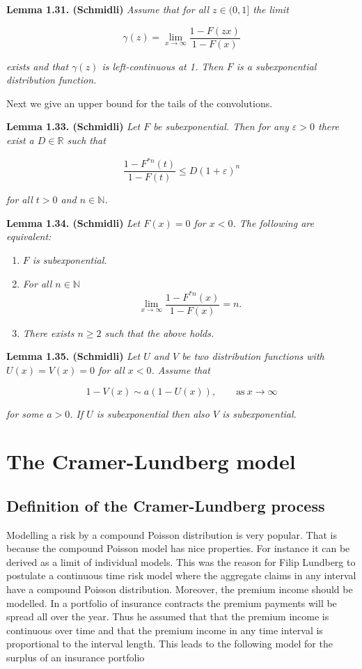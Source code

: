 \documentclass[a4paper,12pt,openany]{book}
\providecommand{\tightlist}{%
 \setlength{\itemsep}{0pt}\setlength{\parskip}{0pt}}
\begin{document}
\textbf{Lemma 1.31. (Schmidli)} \emph{Assume that for all \(z\in (0,1]\) the limit}

\[
\gamma(z)=\lim_{x\to\infty}\frac{1-F(zx)}{1-F(x)}
\]

\emph{exists and that \(\gamma(z)\) is left-continuous at 1. Then \(F\) is a subexponential distribution function.}

Next we give an upper bound for the tails of the convolutions.

\textbf{Lemma 1.33. (Schmidli)} \emph{Let \(F\) be subexponential. Then for any \(\varepsilon>0\) there exist a \(D\in\mathbb R\) such that}

\[
\frac{1-F^{*n}(t)}{1-F(t)}\le D(1+\varepsilon)^n
\]

\emph{for all \(t>0\) and \(n\in\mathbb N\).}

\textbf{Lemma 1.34. (Schmidli)} \emph{Let \(F(x)=0\) for \(x<0\). The following are equivalent:}

\begin{enumerate}
\def\labelenumi{\roman{enumi})}
\tightlist
\item
  \emph{\(F\) is subexponential.}
\item
  \emph{For all \(n\in\mathbb N\)}
  \[\lim_{x\to\infty}\frac{1-F^{*n}(x)}{1-F(x)}=n.\]
\item
  \emph{There exists \(n\ge 2\) such that the above holds.}
\end{enumerate}

\textbf{Lemma 1.35. (Schmidli)} \emph{Let \(U\) and \(V\) be two distribution functions with \(U(x)=V(x)=0\) for all \(x<0\). Assume that}

\[
1-V(x)\sim a(1-U(x)),\qquad \text{as}\ x\to\infty
\]

\emph{for some \(a>0\). If \(U\) is subexponential then also \(V\) is subexponential.}

\hypertarget{the-cramer-lundberg-model}{%
\section{The Cramer-Lundberg model}\label{the-cramer-lundberg-model}}

\hypertarget{definition-of-the-cramer-lundberg-process}{%
\subsection{Definition of the Cramer-Lundberg process}\label{definition-of-the-cramer-lundberg-process}}

Modelling a risk by a compound Poisson distribution is very popular. That is because the compound Poisson model has nice properties. For instance it can be derived as a limit of individual models. This was the reason for Filip Lundberg to postulate a continuous time risk model where the aggregate claims in any interval have a compound Poisson distribution. Moreover, the premium income should be modelled. In a portfolio of insurance contracts the premium payments will be spread all over the year. Thus he assumed that that the premium income is continuous over time and that the premium income in any time interval is proportional to the interval length. This leads to the following model for the surplus of an insurance portfolio
\end{document}
